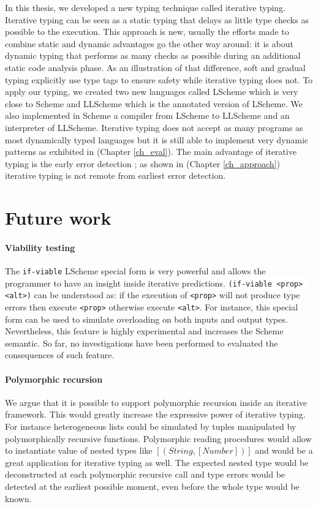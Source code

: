 \documentclass[a4paper]{report}
\newcommand{\ischeme}[1]{\colorbox{white}{\lstinline[language=scheme]&#1&}} %
\newcommand{\refch}[1]{(Chapter \ref{#1})}
\begin{document}
In this thesis, we developed a new typing technique called iterative typing. Iterative typing can be seen as a static typing that delays as little type checks as possible to the execution. This approach is new, usually the efforts made to combine static and dynamic advantages go the other way around: it is about dynamic typing that performs as many checks as possible during an additional static code analysis phase. As an illustration of that difference, soft and gradual typing explicitly use type tags to ensure safety while iterative typing does not. To apply our typing, we created two new languages called LScheme which is very close to Scheme and LLScheme which is the annotated version of LScheme. We also implemented in Scheme a compiler from LScheme to LLScheme and an interpreter of LLScheme. Iterative typing does not accept as many programs as most dynamically typed languages but it is still able to implement very dynamic patterns as exhibited in \refch{ch_eval}. The main advantage of iterative typing is the early error detection ; as shown in \refch{ch_approach} iterative typing is not remote from earliest error detection.

\section{Future work}

\paragraph{Viability testing} The \ischeme{if-viable} LScheme special form is very powerful and allows the programmer to have an insight inside iterative predictions. \ischeme{(if-viable <prop> <alt>)} can be understood as: if the execution of \ischeme{<prop>} will not produce type errors then execute \ischeme{<prop>} otherwise execute \ischeme{<alt>}. For instance, this special form can be used to simulate overloading on both inputs and output types. Nevertheless, this feature is highly experimental and increases the Scheme semantic. So far, no investigations have been performed to evaluated the consequences of such feature. 

\paragraph{Polymorphic recursion} We argue that it is possible to support polymorphic recursion inside an iterative framework. This would greatly increase the expressive power of iterative typing. For instance heterogeneous lists could be simulated by tuples manipulated by polymorphically recursive functions. Polymorphic reading procedures would allow to instantiate value of nested types like $\left[(String,[Number])\right]$ and would be a great application for iterative typing as well. The expected nested type would be deconstructed at each polymorphic recursive call and type errors would be detected at the earliest possible moment, even before the whole type would be known.
\end{document}
